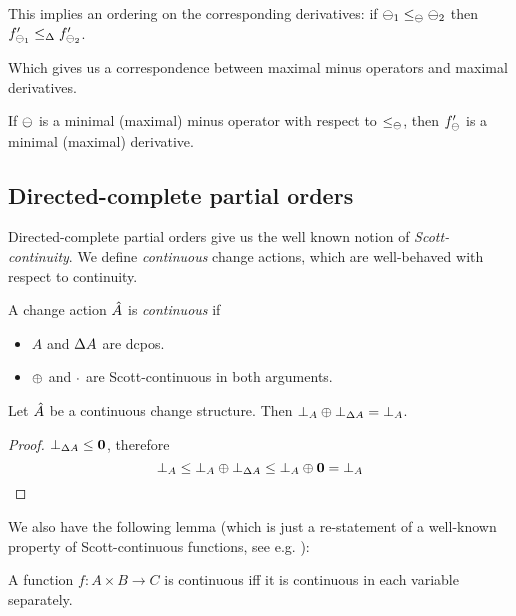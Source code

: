This implies an ordering on the corresponding derivatives: if $\ominus_1 \leq_\ominus \ominus_2$ then
$f'_{\ominus_1} \leq_\Delta f'_{\ominus_2}$.

Which gives us a correspondence between maximal minus operators and maximal derivatives.

\begin{prop}
  \label{prop:maximalMinusDerivatives}
  If $\ominus$ is a minimal (maximal) minus operator with respect to
  $\leq_\ominus$, then $f'_\ominus$ is a minimal (maximal) derivative.
\end{prop}

\subsection{Directed-complete partial orders}

Directed-complete partial orders give us the well known notion of
\emph{Scott-continuity}. We define \emph{continuous} change actions,
which are well-behaved with respect to continuity.

\begin{defn}
  A change action $\hat{A}$ is \emph{continuous} if
  \begin{itemize}
    \item $A$ and $\Delta A$ are dcpos.
    \item $\oplus$ and $\cdot$ are Scott-continuous in both arguments.
  \end{itemize}
\end{defn}

\begin{corollary}
  \label{cor:bottomPlusBottom}
  Let $\hat{A}$ be a continuous change structure. Then $\bot_A \oplus
  \bot_{\Delta A} = \bot_A$.
\end{corollary}
\ifproofs
\begin{proof}
  $\bot_{\Delta A} \leq \textbf{0}$, therefore
  \begin{displaymath}
    \bot_A \leq \bot_A \oplus \bot_{\Delta A} \leq \bot_A \oplus \textbf{0} = \bot_A
  \end{displaymath}
\end{proof}
\fi

We also have the following lemma (which is just a re-statement of a well-known
property of Scott-continuous functions, see e.g. \cite[Lemma~3.2.6]{abramsky1994domain}):

\begin{prop}
  \label{prop:distributivityLimit}
  A function $f : A \times B \rightarrow C$ is continuous iff it is continuous in each variable separately.
\end{prop}

